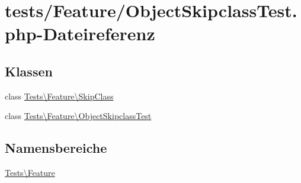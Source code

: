 \hypertarget{ObjectSkipclassTest_8php}{}\section{tests/\+Feature/\+Object\+Skipclass\+Test.php-\/\+Dateireferenz}
\label{ObjectSkipclassTest_8php}
\subsection*{Klassen}
\begin{DoxyCompactItemize}
\item 
class \hyperlink{classTests_1_1Feature_1_1SkipClass}{Tests\textbackslash{}\+Feature\textbackslash{}\+Skip\+Class}
\item 
class \hyperlink{classTests_1_1Feature_1_1ObjectSkipclassTest}{Tests\textbackslash{}\+Feature\textbackslash{}\+Object\+Skipclass\+Test}
\end{DoxyCompactItemize}
\subsection*{Namensbereiche}
\begin{DoxyCompactItemize}
\item 
 \hyperlink{namespaceTests_1_1Feature}{Tests\textbackslash{}\+Feature}
\end{DoxyCompactItemize}
